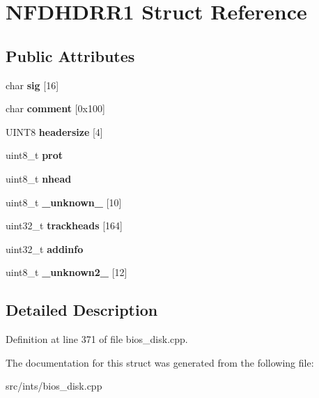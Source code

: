 \hypertarget{structNFDHDRR1}{\section{N\-F\-D\-H\-D\-R\-R1 Struct Reference}
\label{structNFDHDRR1}
}
\subsection*{Public Attributes}
\begin{DoxyCompactItemize}
\item 
\hypertarget{structNFDHDRR1_a88c7b4320bd3b63517da741c8acbdd26}{char {\bfseries sig} \mbox{[}16\mbox{]}}\label{structNFDHDRR1_a88c7b4320bd3b63517da741c8acbdd26}

\item 
\hypertarget{structNFDHDRR1_aac2dabcaf3225121f4ac747b638184e6}{char {\bfseries comment} \mbox{[}0x100\mbox{]}}\label{structNFDHDRR1_aac2dabcaf3225121f4ac747b638184e6}

\item 
\hypertarget{structNFDHDRR1_abe4da2c967610d416a133a6873827358}{U\-I\-N\-T8 {\bfseries headersize} \mbox{[}4\mbox{]}}\label{structNFDHDRR1_abe4da2c967610d416a133a6873827358}

\item 
\hypertarget{structNFDHDRR1_a25243b1e51b29f3d3b6d84f456b5ffd5}{uint8\-\_\-t {\bfseries prot}}\label{structNFDHDRR1_a25243b1e51b29f3d3b6d84f456b5ffd5}

\item 
\hypertarget{structNFDHDRR1_a7a989484ceb7866b317a05db688d8ad8}{uint8\-\_\-t {\bfseries nhead}}\label{structNFDHDRR1_a7a989484ceb7866b317a05db688d8ad8}

\item 
\hypertarget{structNFDHDRR1_a824fa111f184422b485041fa29d2775d}{uint8\-\_\-t {\bfseries \-\_\-unknown\-\_\-} \mbox{[}10\mbox{]}}\label{structNFDHDRR1_a824fa111f184422b485041fa29d2775d}

\item 
\hypertarget{structNFDHDRR1_aa033251a32e455d71aa6602d92c0aed1}{uint32\-\_\-t {\bfseries trackheads} \mbox{[}164\mbox{]}}\label{structNFDHDRR1_aa033251a32e455d71aa6602d92c0aed1}

\item 
\hypertarget{structNFDHDRR1_a6842fd4156f843a938c03367460b93ee}{uint32\-\_\-t {\bfseries addinfo}}\label{structNFDHDRR1_a6842fd4156f843a938c03367460b93ee}

\item 
\hypertarget{structNFDHDRR1_aa17d043d75862352c19ffb2667ea647b}{uint8\-\_\-t {\bfseries \-\_\-unknown2\-\_\-} \mbox{[}12\mbox{]}}\label{structNFDHDRR1_aa17d043d75862352c19ffb2667ea647b}

\end{DoxyCompactItemize}


\subsection{Detailed Description}


Definition at line 371 of file bios\-\_\-disk.\-cpp.



The documentation for this struct was generated from the following file\-:\begin{DoxyCompactItemize}
\item 
src/ints/bios\-\_\-disk.\-cpp\end{DoxyCompactItemize}
